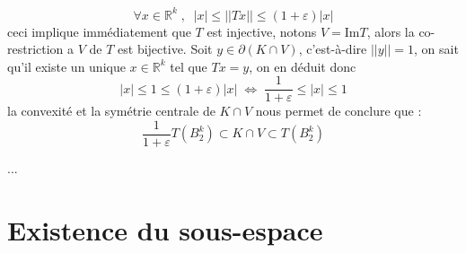 \documentclass[12pt]{article}
\begin{document}
\begin{enumerate}
	\begin{equation*}
	\forall x \in \mathbb{R}^k \; , \;\; |x|\leq ||Tx||\leq (1+\varepsilon)|x|
	\end{equation*}
	ceci implique immédiatement que $T$ est injective, notons $V=\text{Im}T$, alors la co-restriction a $V$ de $T$ est bijective.
	Soit $y\in \partial(K\cap V)$, c'est-à-dire $||y||=1$, on sait qu'il existe un unique $x\in\mathbb{R}^k$ tel que $Tx=y$, on en déduit donc 
	\begin{equation*}
	|x|\leq 1 \leq (1+\varepsilon)|x|\; \iff\; \frac{1}{1+\varepsilon}\leq|x|\leq 1
	\end{equation*}
	la convexité et la symétrie centrale de $K\cap V$ nous permet de conclure que  :
	\begin{equation*}
		\frac{1}{1+\varepsilon}T(B_2^k)\subset K\cap V \subset T(B_2^k)
	\end{equation*}
\begin{center}\huge\color{red}...\color{black}\end{center}
\end{enumerate}
\newpage

\section{Existence du sous-espace}
\end{document}
